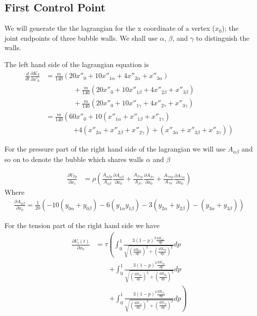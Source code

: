 \documentclass{article}
\begin{document}
\subsection{First Control Point}
We will generate the the lagrangian for the x coordinate of a vertex ($x_0$);
the joint endpoints of three bubble walls. We shall use $\alpha$, $\beta$, and $\gamma$ to
distinguish the walls.

The left hand side of the lagrangian equation is 
\begin{align*}
\frac{d}{d t} \frac{\partial K_T}{\partial x'_0}&=
\frac{m}{140}  \left( 20x''_0+10x''_{1\alpha}+4x''_{2\alpha}+x''_{3\alpha} \right)\\
&\qquad\qquad +\frac{m}{140}\left(
20x''_0+10x''_{1\beta}+4x''_{2\beta}+x''_{3\beta}\right)\\ 
&\qquad\qquad +\frac{m}{140} \left(
20x''_0+10x''_{1\gamma}+4x''_{2\gamma}+x''_{3\gamma} \right)\\
 &=\frac{m}{140} \left(
60x''_0
+10(x''_{1\alpha}+x''_{1\beta}+x''_{1\gamma})\right.\\
&\qquad\qquad \left.+4(x''_{2\alpha}+x''_{2\beta}+x''_{2\gamma})
+(x''_{3\alpha}+x''_{3\beta}+x''_{3\gamma}) \right)
\end{align*}

For the pressure part of the right hand side of the lagrangian we will use
$A_{\alpha\beta}$ and so on to denote the bubble which shares walls $\alpha$ and
$\beta$

\begin{align*}
\frac{\partial V_{Tp}}{\partial x_1} &= 
\rho \left(
\frac{A_{\alpha\beta\rho}}{A_{\alpha\beta}} \frac{\partial
A_{\alpha\beta}}{\partial x_0} 
+\frac{A_{\beta\gamma\rho}}{A_{\beta\gamma}} \frac{\partial
A_{\beta\gamma}}{\partial x_0} 
+\frac{A_{\gamma\alpha\rho}}{A_{\gamma\alpha}} \frac{\partial
A_{\gamma\alpha}}{\partial x_0} 
\right)
\end{align*}
Where
\begin{align*}
\frac{\partial A_{\alpha\beta}}{\partial x_0}=\frac{1}{20}
\left(-10(y_{0\alpha}+y_{0\beta})-6(y_{1\alpha}y_{1\beta})-3(y_{2\alpha}+y_{2\beta})-(y_{3\alpha}+y_{3\beta})\right)
\end{align*}

For the tension part of the right hand side we have
\begin{align*}
\frac{\partial V_s(t)}{\partial x_0}&=
\tau\left(\int_0^1\frac{3(1-p)^2  \frac{d B_{\alpha x}}{dp}}{
  \sqrt{\left(\frac{d B_{\alpha x}}{dp}\right)^2+\left(\frac{d
B_{\alpha y}}{dp}\right)^2}} dp\right.\\
&\qquad \left.+\int_0^1\frac{3(1-p)^2  \frac{d B_{\beta x}}{dp}}{
  \sqrt{\left(\frac{d B_{\beta x}}{dp}\right)^2+\left(\frac{d
B_{\beta y}}{dp}\right)^2}} dp\right.\\
&\qquad \left.+\int_0^1\frac{3(1-p)^2  \frac{d B_{\gamma x}}{dp}}{
  \sqrt{\left(\frac{d B_{\gamma x}}{dp}\right)^2+\left(\frac{d
B_{\gamma y}}{dp}\right)^2}} dp
\right)
\end{align*}
\end{document}
